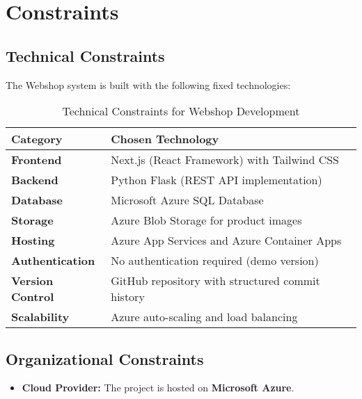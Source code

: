 \section{Constraints}

\subsection{Technical Constraints}
The Webshop system is built with the following fixed technologies:

\begin{table}[h]
\centering
\begin{tabular}{|l|l|}
\hline
\textbf{Category} & \textbf{Chosen Technology} \\ \hline
\textbf{Frontend} & Next.js (React Framework) with Tailwind CSS \\ \hline
\textbf{Backend} & Python Flask (REST API implementation) \\ \hline
\textbf{Database} & Microsoft Azure SQL Database \\ \hline
\textbf{Storage} & Azure Blob Storage for product images \\ \hline
\textbf{Hosting} & Azure App Services and Azure Container Apps \\ \hline
\textbf{Authentication} & No authentication required (demo version) \\ \hline
\textbf{Version Control} & GitHub repository with structured commit history \\ \hline
\textbf{Scalability} & Azure auto-scaling and load balancing \\ \hline
\end{tabular}
\caption{Technical Constraints for Webshop Development}
\label{tab:constraints}
\end{table}

\subsection{Organizational Constraints}
\begin{itemize}
    \item \textbf{Cloud Provider:} The project is hosted on \textbf{Microsoft Azure}.
\end{itemize}

